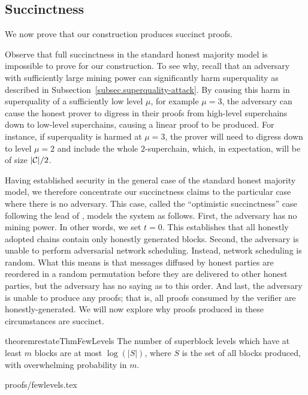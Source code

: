 \subsection{Succinctness}

We now prove that our construction produces succinct proofs.

Observe that full succinctness in the standard honest majority model is
impossible to prove for our construction. To see why, recall that an adversary
with sufficiently large mining power can significantly harm superquality as
described in Subsection~\ref{subsec.superquality-attack}. By causing this harm
in superquality of a sufficiently low level $\mu$, for example $\mu = 3$, the
adversary can cause the honest prover to digress in their proofs from high-level
superchains down to low-level superchains, causing a linear proof to be
produced. For instance, if superquality is harmed at $\mu = 3$, the prover will
need to digress down to level $\mu = 2$ and include the whole $2$-superchain,
which, in expectation, will be of size $|\mathcal{C}|/2$.

Having established security in the general case of the standard honest majority
model, we therefore concentrate our succinctness claims to the particular case
where there is no adversary. This case, called the ``optimistic succinctness''
case following the lead of \cite{KLS}, models the system as follows. First, the
adversary has no mining power. In other words, we set $t = 0$. This establishes
that all honestly adopted chains contain only honestly generated blocks. Second,
the adversary is unable to perform adversarial network scheduling. Instead,
network scheduling is random. What this means is that messages diffused by
honest parties are reordered in a random permutation before they are delivered
to other honest parties, but the adversary has no saying as to this order. And
last, the adversary is unable to produce any proofs; that is, all proofs
consumed by the verifier are honestly-generated. We will now explore why proofs
produced in these circumstances are succinct.

\begin{restatable}{theorem}{restateThmFewLevels}
    \label{thm.few-levels}
    The number of superblock levels which have at least $m$ blocks are at most
    $\log(|S|)$, where $S$ is the set of all blocks produced, with overwhelming
    probability in $m$.
\end{restatable}

\ifonecolumn
{proofs/fewlevels.tex}
\fi

